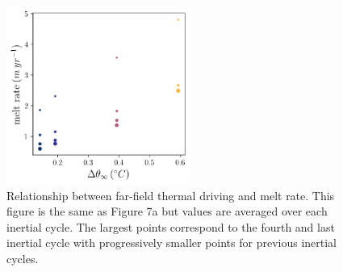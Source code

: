 \documentclass[tc, manuscript]{copernicus}
\begin{document}
\begin{figure}[t]
\includegraphics[width=6cm]{figS7.pdf}
\caption{Relationship between far-field thermal driving and melt rate. This figure is the same as Figure 7a but values are averaged over each inertial cycle. The largest points correspond to the fourth and last inertial cycle with progressively smaller points for previous inertial cycles.}
\label{fig:melt_sensitivity_cycles}
\end{figure}
\end{document}
